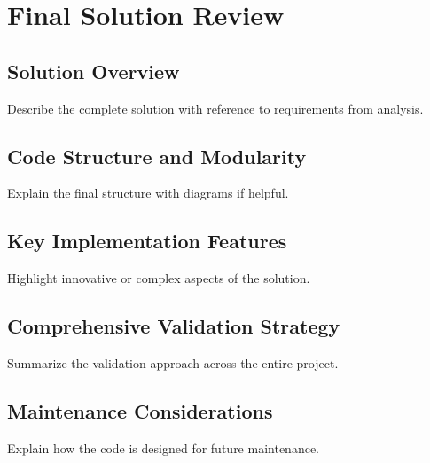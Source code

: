 \section{Final Solution Review}

\subsection{Solution Overview}
Describe the complete solution with reference to requirements from analysis.

\subsection{Code Structure and Modularity}
Explain the final structure with diagrams if helpful.

\subsection{Key Implementation Features}
Highlight innovative or complex aspects of the solution.

\subsection{Comprehensive Validation Strategy}
Summarize the validation approach across the entire project.

\subsection{Maintenance Considerations}
Explain how the code is designed for future maintenance.

